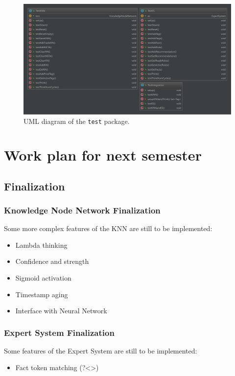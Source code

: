 \documentclass{beamer}
\newcommand{\code}[1]{\texttt{#1}}
\begin{document}
	\begin{frame}
		\begin{figure}
			\centering
			\includegraphics[width=\textwidth]{figures/uml_test.pdf}
			\caption
			{UML diagram of the \code{test} package.}
			\label{fig:uml_test}
		\end{figure}
	\end{frame}
	
	\section[Next semester]{Work plan for next semester}
	
	\subsection{Finalization}
	
	\begin{frame}
		\frametitle{Knowledge Node Network Finalization}
		Some more complex features of the KNN are still to be implemented:
		\begin{itemize}
			\item Lambda thinking
			\item Confidence and strength
			\item Sigmoid activation
			\item Timestamp aging
			\item Interface with Neural Network
		\end{itemize}
	\end{frame}
	
	\begin{frame}
		\frametitle{Expert System Finalization}
		Some features of the Expert System are still to be implemented:
		\begin{itemize}
			\item Fact token matching (?\quad \textless \quad \textgreater)
		\end{itemize}
	\end{frame}
\end{document}
